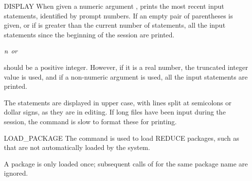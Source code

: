 \begin{Command}[display]{DISPLAY}
When given a numeric argument ,  prints the 
most recent input statements, identified by prompt numbers.  If an empty
pair of parentheses is given, or if  is greater than the current
number of statements, all the input statements since the beginning of
the session are printed.

\begin{Syntax}
\(\meta{n}\) {\em or} \(\)
\end{Syntax}

 should be a positive integer.  However, if it is a real number, the
truncated integer value is used, and if a non-numeric argument is used, all
the input statements are printed.

\begin{Comments}
The statements are displayed in upper case, with lines split at semicolons or
dollar signs, as they are in editing.  If long files have been input during
the session, the  command is slow to format these for
printing.
\end{Comments}
\end{Command}


\begin{Command}{LOAD\_PACKAGE}
The  command is used to load REDUCE packages, such as
 that are not automatically loaded by the system.
\begin{Syntax}
\end{Syntax}

A package is only loaded once; subsequent calls of 
for the same package name are ignored.
\end{Command}


